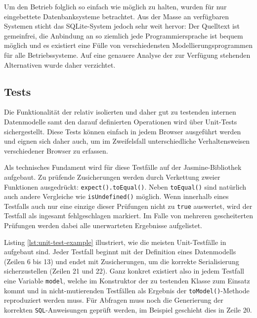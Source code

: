 Um den Betrieb folglich so einfach wie möglich zu halten, wurden für \idename{} nur eingebettete Datenbanksysteme betrachtet. Aus der Masse an verfügbaren Systemen sticht das SQLite-System jedoch sehr weit hervor: Der Quelltext ist gemeinfrei, die Anbindung an so ziemlich jede Programmiersprache ist bequem möglich und es existiert eine Fülle von verschiedensten Modellierungsprogrammen für alle Betriebssysteme. Auf eine genauere Analyse der zur Verfügung stehenden Alternativen wurde daher verzichtet.

\subsection{Tests}
\label{sec:implementation-tests}

Die Funktionalität der relativ isolierten und daher gut zu testenden internen Datenmodelle samt den darauf definierten Operationen wird über Unit-Tests sichergestellt. Diese Tests können einfach in jedem Browser ausgeführt werden und eignen sich daher auch, um im Zweifelsfall unterschiedliche Verhaltensweisen verschiedener Browser zu erfassen.

Als technisches Fundament wird für diese Testfälle auf der Jasmine-Bibliothek aufgebaut. Zu prüfende Zusicherungen werden durch Verkettung zweier Funktionen ausgedrückt: \texttt{expect().toEqual()}. Neben \texttt{toEqual()} sind natürlich auch andere Vergleiche wie \texttt{isUndefined()} möglich. Wenn innerhalb eines Testfalls auch nur eine einzige dieser Prüfungen nicht zu \texttt{true} auswertet, wird der Testfall als ingesamt fehlgeschlagen markiert. Im Falle von mehreren gescheiterten Prüfungen werden dabei alle unerwarteten Ergebnisse aufgelistet.





Listing \ref{lst:unit-test-example} illustriert, wie die meisten Unit-Testfälle in \idename{} aufgebaut sind. Jeder Testfall beginnt mit der Definition eines Datenmodells (Zeilen 6 bis 13) und endet mit Zusicherungen, um die korrekte Serialisierung sicherzustellen (Zeilen 21 und 22). Ganz konkret existiert also in jedem Testfall eine Variable \texttt{model}, welche im Konstruktor der zu testenden Klasse zum Einsatz kommt und in nicht-mutierenden Testfällen als Ergebnis der \texttt{toModel()}-Methode reproduziert werden muss. Für Abfragen muss noch die Generierung der korrekten \texttt{SQL}-Anweisungen geprüft werden, im Beispiel geschieht dies in Zeile 20.

